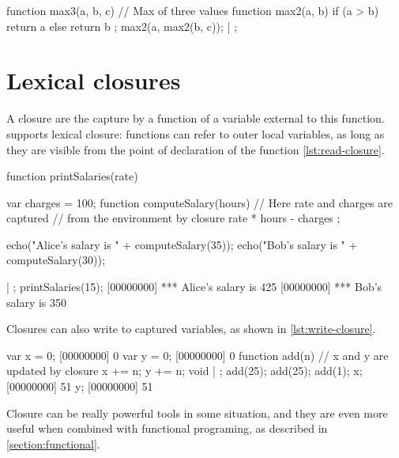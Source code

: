 \begin{urbiscript}[caption=Local helper function, label=lst:helper]
function max3(a, b, c) // Max of three values
{
  function max2(a, b)
  {
    if (a > b)
      return a
    else
      return b
  };
  max2(a, max2(b, c));
} | {};
\end{urbiscript}

\section{Lexical closures}

A closure are the capture by a function of a variable external to this
function. \urbi supports lexical closure: functions can refer to outer
local variables, as long as they are visible from the point of
declaration of the function \autoref{lst:read-closure}.

\begin{urbiscript}[caption=Capturing variables with lexical closures,
label=lst:read-closure]
function printSalaries(rate)
{
  var charges = 100;
  function computeSalary(hours)
  {
    // Here rate and charges are captured
    // from the environment by closure
    rate * hours - charges
  };

  echo("Alice's salary is " + computeSalary(35));
  echo("Bob's salary is " + computeSalary(30));
} | {};
printSalaries(15);
[00000000] *** Alice's salary is 425
[00000000] *** Bob's salary is 350
\end{urbiscript}

Closures can also write to captured variables, as shown in
\autoref{lst:write-closure}.

\begin{urbiscript}[caption=Updating captured variables,
label=lst:write-closure]
var x = 0;
[00000000] 0
var y = 0;
[00000000] 0
function add(n)
{
  // x and y are updated by closure
  x += n;
  y += n;
  void
} | {};
add(25);
add(25);
add(1);
x;
[00000000] 51
y;
[00000000] 51
\end{urbiscript}

Closure can be really powerful tools in some situation, and they are
even more useful when combined with functional programing, as
described in \autoref{section:functional}.


